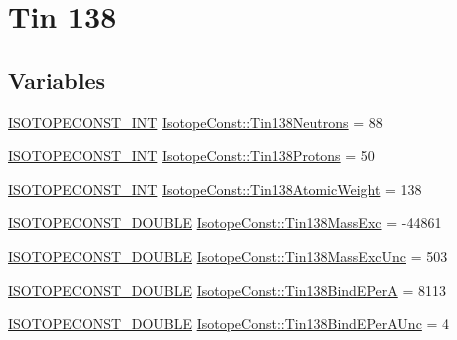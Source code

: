 \hypertarget{group___isotope_const-_tin-_sn138}{}\section{Tin 138}
\label{group___isotope_const-_tin-_sn138}
\subsection*{Variables}
\begin{DoxyCompactItemize}
\item 
\mbox{\hyperlink{group___isotope_const-_macros_ga5f18360b3e99483a35c32d789e62621c}{I\+S\+O\+T\+O\+P\+E\+C\+O\+N\+S\+T\+\_\+\+I\+NT}} \mbox{\hyperlink{group___isotope_const-_tin-_sn138_ga0aa0f391d07f0005748550ed740dc886}{Isotope\+Const\+::\+Tin138\+Neutrons}} = 88
\item 
\mbox{\hyperlink{group___isotope_const-_macros_ga5f18360b3e99483a35c32d789e62621c}{I\+S\+O\+T\+O\+P\+E\+C\+O\+N\+S\+T\+\_\+\+I\+NT}} \mbox{\hyperlink{group___isotope_const-_tin-_sn138_gaa682d4ebb9faef67c68104fb123e0b72}{Isotope\+Const\+::\+Tin138\+Protons}} = 50
\item 
\mbox{\hyperlink{group___isotope_const-_macros_ga5f18360b3e99483a35c32d789e62621c}{I\+S\+O\+T\+O\+P\+E\+C\+O\+N\+S\+T\+\_\+\+I\+NT}} \mbox{\hyperlink{group___isotope_const-_tin-_sn138_ga676602b2106fe7ecc2e1bb215dbaa084}{Isotope\+Const\+::\+Tin138\+Atomic\+Weight}} = 138
\item 
\mbox{\hyperlink{group___isotope_const-_macros_ga8f45a7272ce02c0b4c65c44636ed719a}{I\+S\+O\+T\+O\+P\+E\+C\+O\+N\+S\+T\+\_\+\+D\+O\+U\+B\+LE}} \mbox{\hyperlink{group___isotope_const-_tin-_sn138_ga351c61c411294bde1008635ebb0494af}{Isotope\+Const\+::\+Tin138\+Mass\+Exc}} = -\/44861
\item 
\mbox{\hyperlink{group___isotope_const-_macros_ga8f45a7272ce02c0b4c65c44636ed719a}{I\+S\+O\+T\+O\+P\+E\+C\+O\+N\+S\+T\+\_\+\+D\+O\+U\+B\+LE}} \mbox{\hyperlink{group___isotope_const-_tin-_sn138_ga37e056067b7df700dd9cd0d68f252ee1}{Isotope\+Const\+::\+Tin138\+Mass\+Exc\+Unc}} = 503
\item 
\mbox{\hyperlink{group___isotope_const-_macros_ga8f45a7272ce02c0b4c65c44636ed719a}{I\+S\+O\+T\+O\+P\+E\+C\+O\+N\+S\+T\+\_\+\+D\+O\+U\+B\+LE}} \mbox{\hyperlink{group___isotope_const-_tin-_sn138_ga3b35cdcb243ad65b6db08d123bcdc4ed}{Isotope\+Const\+::\+Tin138\+Bind\+E\+PerA}} = 8113
\item 
\mbox{\hyperlink{group___isotope_const-_macros_ga8f45a7272ce02c0b4c65c44636ed719a}{I\+S\+O\+T\+O\+P\+E\+C\+O\+N\+S\+T\+\_\+\+D\+O\+U\+B\+LE}} \mbox{\hyperlink{group___isotope_const-_tin-_sn138_gaa524bb5bc58a1929f5947d588515663e}{Isotope\+Const\+::\+Tin138\+Bind\+E\+Per\+A\+Unc}} = 4

\end{DoxyCompactItemize}
